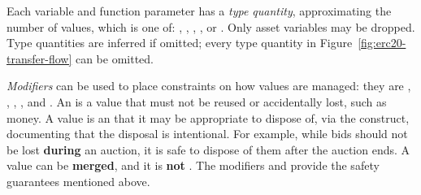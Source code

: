\documentclass[nonacm, dvipsnames, sigconf]{acmart}
\begin{document}
Each variable and function parameter has a \emph{type quantity}, approximating the number of values, which is one of: , , , , or .
Only  asset variables may be dropped.
Type quantities are inferred if omitted; every type quantity in Figure~\ref{fig:erc20-transfer-flow} can be omitted.

\emph{Modifiers} can be used to place constraints on how values are managed: they are , , , , and .
An  is a value that must not be reused or accidentally lost, such as money.
A  value is an  that it may be appropriate to dispose of, via the  construct, documenting that the disposal is intentional.
For example, while bids should not be lost \textbf{during} an auction, it is safe to dispose of them after the auction ends.
A  value can be \textbf{merged}, and it is \textbf{not} .
The modifiers  and  provide the safety guarantees mentioned above.
\end{document}
